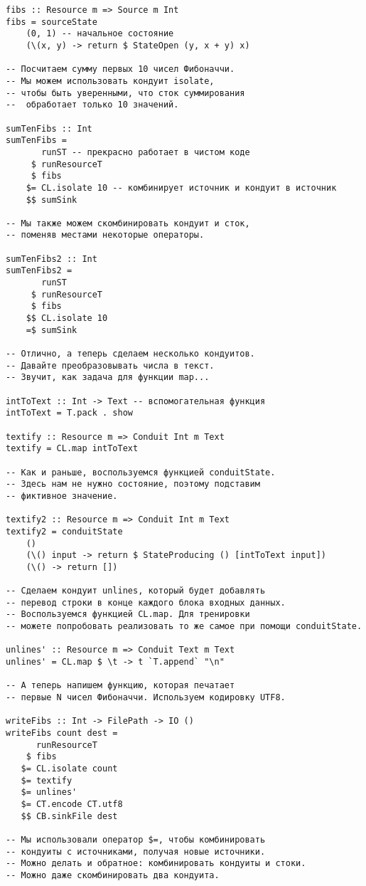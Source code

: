 \begin{lstlisting}
fibs :: Resource m => Source m Int
fibs = sourceState
    (0, 1) -- начальное состояние
    (\(x, y) -> return $ StateOpen (y, x + y) x)

-- Посчитаем сумму первых 10 чисел Фибоначчи.
-- Мы можем использовать кондуит isolate,
-- чтобы быть уверенными, что сток суммирования
--  обработает только 10 значений.

sumTenFibs :: Int
sumTenFibs =
       runST -- прекрасно работает в чистом коде
     $ runResourceT
     $ fibs
    $= CL.isolate 10 -- комбинирует источник и кондуит в источник
    $$ sumSink

-- Мы также можем скомбинировать кондуит и сток,
-- поменяв местами некоторые операторы.

sumTenFibs2 :: Int
sumTenFibs2 =
       runST
     $ runResourceT
     $ fibs
    $$ CL.isolate 10
    =$ sumSink

-- Отлично, а теперь сделаем несколько кондуитов.
-- Давайте преобразовывать числа в текст.
-- Звучит, как задача для функции map...

intToText :: Int -> Text -- вспомогательная функция
intToText = T.pack . show

textify :: Resource m => Conduit Int m Text
textify = CL.map intToText

-- Как и раньше, воспользуемся функцией conduitState.
-- Здесь нам не нужно состояние, поэтому подставим
-- фиктивное значение.

textify2 :: Resource m => Conduit Int m Text
textify2 = conduitState
    ()
    (\() input -> return $ StateProducing () [intToText input])
    (\() -> return [])

-- Сделаем кондуит unlines, который будет добавлять
-- перевод строки в конце каждого блока входных данных.
-- Воспользуемся функцией CL.map. Для тренировки
-- можете попробовать реализовать то же самое при помощи conduitState.

unlines' :: Resource m => Conduit Text m Text
unlines' = CL.map $ \t -> t `T.append` "\n"

-- А теперь напишем функцию, которая печатает
-- первые N чисел Фибоначчи. Используем кодировку UTF8.

writeFibs :: Int -> FilePath -> IO ()
writeFibs count dest =
      runResourceT
    $ fibs
   $= CL.isolate count
   $= textify
   $= unlines'
   $= CT.encode CT.utf8
   $$ CB.sinkFile dest

-- Мы использовали оператор $=, чтобы комбинировать
-- кондуиты с источниками, получая новые источники.
-- Можно делать и обратное: комбинировать кондуиты и стоки.
-- Можно даже скомбинировать два кондуита.


\end{lstlisting}
